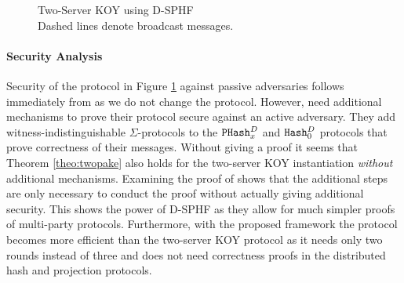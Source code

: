 \begin{figure}[tbhp]
\caption[Two-Server KOY using D-SPHF]{Two-Server KOY \cite{Katz2012a} using D-SPHF
\\{\small Dashed lines denote broadcast messages.}}
\label{fig:twokoy}
\end{figure}

\paragraph{Security Analysis}
Security of the protocol in Figure \ref{fig:twokoy} against passive adversaries follows immediately from \cite[Theorem 1]{Katz2012a} as we do not change the protocol.
However, \citet{Katz2012a} need additional mechanisms to prove their protocol secure against an active adversary.
They add witness-indistinguishable $\Sigma$-protocols to the $\mathtt{PHash}_x^{D}$ and $\mathtt{Hash}_0^{D}$ protocols that prove correctness of their messages.
Without giving a proof it seems that Theorem \ref{theo:twopake} also holds for the two-server KOY instantiation \emph{without} additional mechanisms.
Examining the proof of \cite[Theorem 2]{Katz2012a} shows that the additional steps are only necessary to conduct the proof without actually giving additional security.
This shows the power of \ac{D-SPHF} as they allow for much simpler proofs of multi-party protocols.
Furthermore, with the proposed framework the protocol becomes more efficient than the two-server KOY protocol as it needs only two rounds instead of three and does not need correctness proofs in the distributed hash and projection protocols.
